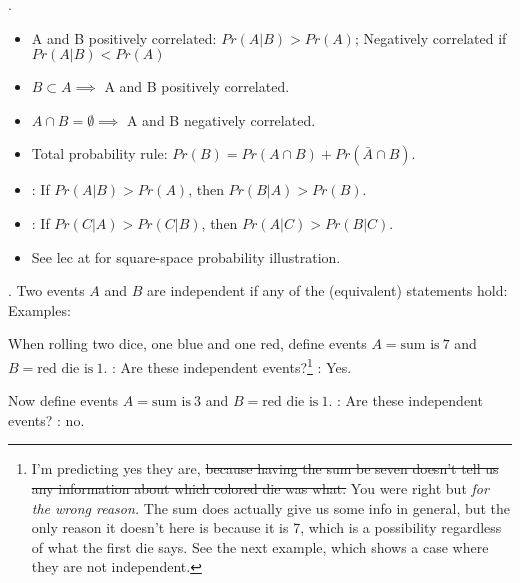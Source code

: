 \documentclass[12pt]{article}
\newcommand{\myspace}{\vspace{2\bigskipamount}}
\newcommand\p{\Needspace{12\baselineskip} \noindent}
\begin{document}
\p {}. 
\begin{itemize}
	\item A and B positively correlated: $Pr(A|B) > Pr(A)$; Negatively correlated if $Pr(A|B) < Pr(A)$
	\item  $B \subset A \implies $ A and B positively correlated. 
	\item $A \cap B = \emptyset \implies$ A and B negatively correlated. 
	\item Total probability rule: $Pr(B) = Pr(A \cap B) + Pr(\bar{A} \cap B)$. 
	\item {}: If $Pr(A|B) > Pr(A)$, then $Pr(B|A) > Pr(B)$. 
	\item {}: If $Pr(C|A) > Pr(C|B)$, then $Pr(A|C) > Pr(B|C)$. 
	\item See lec at \purple{[18:00]} for square-space probability illustration.
\end{itemize}

\myspace
\p {}. Two events $A$ and $B$ are independent if any of the (equivalent) statements hold:
Examples:
\begin{compactitem}[$\rightarrow$]
	\item When rolling two dice, one blue and one red, define events $A = \text{sum is} ~ 7$ and  $B = \text{red die is} ~ 1$. : Are these independent events?\footnote{I'm predicting yes they are, \sout{because having the sum be seven doesn't tell us any information about which colored die was what.} You were right but \textit{for the wrong reason.} The sum does actually give us some info in general, but the only reason it doesn't here is because it is 7, which is a possibility regardless of what the first die says. See the next example, which shows a case where they are not independent.} : Yes.  
	
	\item Now define events $A = \text{sum is} ~ 3$ and  $B = \text{red die is} ~ 1$. : Are these independent events? : no.
\end{compactitem}
\end{document}
